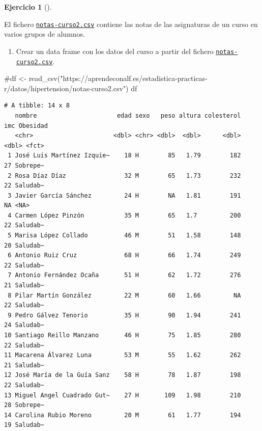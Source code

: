 \documentclass[
  a4paper,
]{scrreport}
\newenvironment{Shaded}{\begin{snugshade}}{\end{snugshade}}
\newcommand{\CommentTok}[1]{\textcolor[rgb]{0.37,0.37,0.37}{#1}}
\newcommand{\NormalTok}[1]{\textcolor[rgb]{0.00,0.23,0.31}{#1}}
\providecommand{\tightlist}{%
  \setlength{\itemsep}{0pt}\setlength{\parskip}{0pt}}\usepackage{longtable,booktabs,array}
\theoremstyle{definition}
\newtheorem{exercise}{Ejercicio}[chapter]
\theoremstyle{remark}
\begin{document}
\leavevmode{}%
\begin{exercise}[]\label{exr-preprocesamiento-3}

El fichero \href{datos/notas-curso2.csv}{\texttt{notas-curso2.csv}}
contiene las notas de las asignaturas de un curso en varios grupos de
alumnos.

\begin{enumerate}
\def\labelenumi{\alph{enumi}.}
\tightlist
\item
  Crear un data frame con los datos del curso a partir del fichero
  \href{datos/notas-curso2.csv}{\texttt{notas-curso2.csv}}.
\end{enumerate}

\begin{tcolorbox}[enhanced jigsaw, breakable, arc=.35mm, leftrule=.75mm, toptitle=1mm, opacitybacktitle=0.6, opacityback=0, title=\textcolor{quarto-callout-tip-color}{\faLightbulb}\hspace{0.5em}{Solución}, colframe=quarto-callout-tip-color-frame, titlerule=0mm, bottomtitle=1mm, colback=white, bottomrule=.15mm, colbacktitle=quarto-callout-tip-color!10!white, toprule=.15mm, rightrule=.15mm, left=2mm, coltitle=black]

\begin{Shaded}
\begin{Highlighting}[]
\CommentTok{\#df \textless{}{-} read\_csv("https://aprendeconalf.es/estadistica{-}practicas{-}r/datos/hipertension/notas{-}curso2.csv")}
\NormalTok{df}
\end{Highlighting}
\end{Shaded}

\begin{verbatim}
# A tibble: 14 x 8
   nombre                      edad sexo   peso altura colesterol   imc Obesidad
   <chr>                      <dbl> <chr> <dbl>  <dbl>      <dbl> <dbl> <fct>   
 1 José Luis Martínez Izquie~    18 H        85   1.79        182    27 Sobrepe~
 2 Rosa Díaz Díaz                32 M        65   1.73        232    22 Saludab~
 3 Javier García Sánchez         24 H        NA   1.81        191    NA <NA>    
 4 Carmen López Pinzón           35 M        65   1.7         200    22 Saludab~
 5 Marisa López Collado          46 M        51   1.58        148    20 Saludab~
 6 Antonio Ruiz Cruz             68 H        66   1.74        249    22 Saludab~
 7 Antonio Fernández Ocaña       51 H        62   1.72        276    21 Saludab~
 8 Pilar Martín González         22 M        60   1.66         NA    22 Saludab~
 9 Pedro Gálvez Tenorio          35 H        90   1.94        241    24 Saludab~
10 Santiago Reillo Manzano       46 H        75   1.85        280    22 Saludab~
11 Macarena Álvarez Luna         53 M        55   1.62        262    21 Saludab~
12 José María de la Guía Sanz    58 H        78   1.87        198    22 Saludab~
13 Miguel Angel Cuadrado Gut~    27 H       109   1.98        210    28 Sobrepe~
14 Carolina Rubio Moreno         20 M        61   1.77        194    19 Saludab~
\end{verbatim}

\end{tcolorbox}

\end{exercise}
\end{document}
